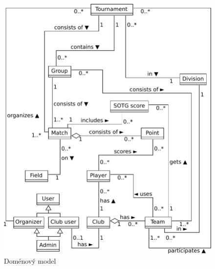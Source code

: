 \begin{figure}[ht!]
\centering
\includegraphics[width=130mm]{./images/domenovy-model.pdf}
\caption{Doménový model\label{overflow}}
\label{fig:domain_model}
\end{figure}


